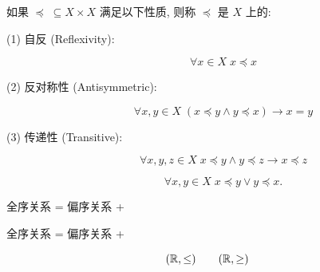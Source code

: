 
\begin{frame}{}
  \begin{definition}
    如果 $\preceq\; \subseteq X \times X$ 满足以下性质, 则称 $\preceq$ 是 $X$ 上的: \\[6pt]
    \begin{description}
      \item[{(1) 自反 (Reflexivity):}]
        \[
          {\forall x \in X\; x \preceq x}
        \]
      \item[(2) 反对称性 (Antisymmetric):]
        \[
          \forall x, y \in X\; (x \preceq y \land y \preceq x) \to x = y
        \]
      \item[(3) 传递性 (Transitive):]
        \[
          \forall x, y, z \in X\; x \preceq y \land y \preceq z \to x \preceq z
        \]
      \item[]
        \[
          \forall x, y \in X\; x \preceq y \lor y \preceq x.
        \]
    \end{description}
  \end{definition}

  \pause
  \begin{center}
    全序关系 = 偏序关系 + 
    \pause \qquad {}
  \end{center}
\end{frame}

\begin{frame}{}
  \begin{center}
    全序关系 = 偏序关系 + 
  \end{center}

  \[
    (\mathbb{R}, \le) \qquad (\mathbb{R}, \ge)
  \]
\end{frame}


